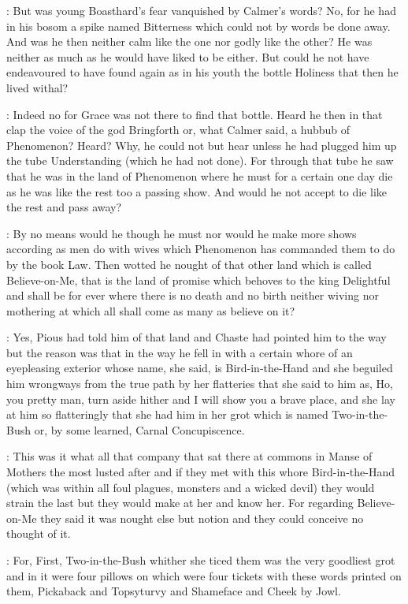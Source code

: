 :
But was young Boasthard's fear vanquished by Calmer's words?
No,
for he had in his bosom a spike named Bitterness
which could not by words be done away.
And was he then neither calm like the one nor godly
like the other?
He was neither as much as he would have liked to be
either.
But could he not have endeavoured to have found again as in his
youth the bottle Holiness that then he lived withal?

:
Indeed no for Grace was not there to find that bottle.
Heard he then
in that clap the voice of the god Bringforth or,
what Calmer said,
a
hubbub of Phenomenon?
Heard?
Why,
he could not but hear unless he had
plugged him up the tube Understanding
(which he had not done).
For through
that tube he saw that he was in the land of Phenomenon where he must for a
certain one day die as he was like the rest too a passing show.
And would he not accept to die like the rest and pass away?

:
By no means would he though he must nor would he make more
shows according as men do with wives which Phenomenon has commanded them
to do by the book Law.
Then wotted he nought of that other land which is
called Believe-on-Me,
that is the land of promise which behoves to the
king Delightful and shall be for ever where there is no death and no
birth neither wiving nor mothering at which all shall come as many as
believe on it?

:
Yes,
Pious had told him of that land and Chaste had pointed him to
the way but the reason was that in the way he fell in with a certain whore
of an eyepleasing exterior whose name,
she said,
is Bird-in-the-Hand
and she beguiled him wrongways
from the true path by her flatteries that she
said to him as,
Ho,
you pretty man,
turn aside hither and I will show you
a brave place,
and she lay at him so flatteringly that she had him in her
grot which is named Two-in-the-Bush or,
by some learned,
Carnal
Concupiscence.


:
This was it what all that company that sat there at commons in Manse of
Mothers the most lusted after and if they met with this whore Bird-in-the-Hand
(which was within all foul plagues,
monsters and a wicked devil)
they would strain the last but they would make at her and know her.
For
regarding Believe-on-Me they said it was nought else but notion and they
could conceive no thought of it.

:
For,
First,
Two-in-the-Bush whither she ticed them was the very
goodliest grot and in it were four pillows on which were four tickets with
these words printed on them,
Pickaback and Topsyturvy and Shameface and
Cheek by Jowl.

